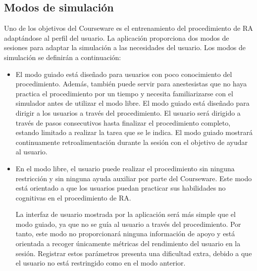 


\subsection{Modos de simulación}
\label{course:modos}
Uno de los objetivos del \ac{Courseware} es el entrenamiento del procedimiento de \ac{RA} adaptándose al perfil del usuario. La aplicación proporciona dos modos de sesiones para adaptar la simulación a las necesidades del usuario. Los modos de simulación se definirán a continuación:

\begin{itemize}
    \item El modo guiado está diseñado para usuarios con poco conocimiento del procedimiento. Además, también puede servir para anestesistas que no haya practica el procedimiento por un tiempo y necesita familiarizarse con el simulador antes de utilizar el modo libre. %
El modo guiado está diseñado para dirigir a los usuarios a través del procedimiento. El usuario será dirigido a través de pasos consecutivos hasta finalizar el procedimiento completo, estando limitado a realizar la tarea que se le indica. El modo guiado mostrará continuamente retroalimentación durante la sesión con el objetivo de ayudar al usuario.%

\item En el modo libre, el usuario puede realizar el procedimiento sin ninguna restricción y sin ninguna ayuda auxiliar por parte del \ac{Courseware}. Este modo está orientado a que los usuarios puedan practicar sus habilidades no cognitivas en el procedimiento de \ac{RA}. 

La interfaz de usuario mostrada por la aplicación será más simple que el modo guiado, ya que no se guía al usuario a través del procedimiento. Por tanto, este modo no proporcionará ninguna información de apoyo y está orientada a recoger únicamente métricas del rendimiento del usuario en la sesión. Registrar estos parámetros presenta una dificultad extra, debido a que el usuario no está restringido como en el modo anterior. %

\end{itemize}

